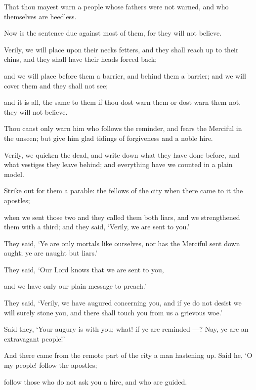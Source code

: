 \documentclass[fontsize=14pt, letterpaper, notitlepage, openany, DIV=12]{scrbook} %
\begin{document}
\noindent[36:6]
That thou mayest warn a people whose fathers were not warned, and who themselves are
heedless.

\noindent[36:7]
Now is the sentence due against most of them, for they will not believe.

\noindent[36:8]
Verily, we will place upon their necks fetters, and they shall reach up to their chins, and
they shall have their heads forced back;

\noindent[36:9]
and we will place before them a barrier, and behind them a barrier; and we will cover
them and they shall not see;

\noindent[36:10]
and it is all, the same to them if thou dost warn them or dost warn them not, they will not
believe.

\noindent[36:11]
Thou canst only warn him who follows the reminder, and fears the Merciful in the
unseen; but give him glad tidings of forgiveness and a noble hire.

\noindent[36:12]
Verily, we quicken the dead, and write down what they have done before, and what
vestiges they leave behind; and everything have we counted in a plain model.

\noindent[36:13]
Strike out for them a parable: the fellows of the city when there came to it the apostles;

\noindent[36:14]
when we sent those two and they called them both liars, and we strengthened them with a
third; and they said, `Verily, we are sent to you.'

\noindent[36:15]
They said, `Ye are only mortals like ourselves, nor has the Merciful sent down aught; ye
are naught but liars.'

\noindent[36:16]
They said, `Our Lord knows that we are sent to you,

\noindent[36:17]
and we have only our plain message to preach.'

\noindent[36:18]
They said, `Verily, we have augured concerning you, and if ye do not desist we will
surely stone you, and there shall touch you from us a grievous woe.'

\noindent[36:19]
Said they, `Your augury is with you; what! if ye are reminded ---? Nay, ye are an
extravagant people!'

\noindent[36:20]
And there came from the remote part of the city a man hastening up. Said he, `O my
people! follow the apostles;

\noindent[36:21]
follow those who do not ask you a hire, and who are guided.
\end{document}
